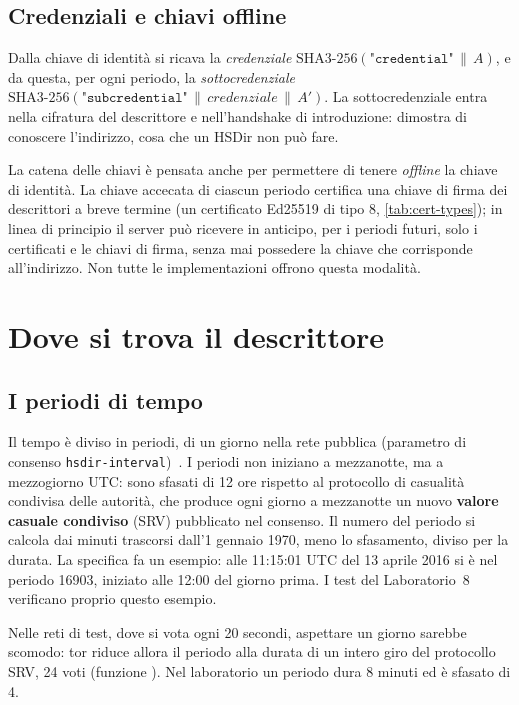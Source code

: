\subsection{Credenziali e chiavi offline}

Dalla chiave di identità si ricava la \emph{credenziale} $\mathrm{SHA3\text{-}256}(\texttt{"credential"} \,\|\, A)$, e da questa, per ogni periodo, la \emph{sottocredenziale} $\mathrm{SHA3\text{-}256}(\texttt{"subcredential"} \,\|\, \mathit{credenziale} \,\|\, A')$. La sottocredenziale entra nella cifratura del descrittore e nell'handshake di introduzione: dimostra di conoscere l'indirizzo, cosa che un HSDir non può fare.

La catena delle chiavi è pensata anche per permettere di tenere \emph{offline} la chiave di identità. La chiave accecata di ciascun periodo certifica una chiave di firma dei descrittori a breve termine (un certificato Ed25519 di tipo 8, \cref{tab:cert-types}); in linea di principio il server può ricevere in anticipo, per i periodi futuri, solo i certificati e le chiavi di firma, senza mai possedere la chiave che corrisponde all'indirizzo. Non tutte le implementazioni offrono questa modalità.

\section{Dove si trova il descrittore}\label{sec:os-hsdir}

\subsection{I periodi di tempo}

Il tempo è diviso in periodi, di un giorno nella rete pubblica (parametro di consenso \texttt{hsdir-interval})~. I periodi non iniziano a mezzanotte, ma a mezzogiorno UTC: sono sfasati di 12 ore rispetto al protocollo di casualità condivisa delle autorità, che produce ogni giorno a mezzanotte un nuovo \textbf{valore casuale condiviso} (SRV) pubblicato nel consenso. Il numero del periodo si calcola dai minuti trascorsi dall'1 gennaio 1970, meno lo sfasamento, diviso per la durata. La specifica fa un esempio: alle 11:15:01 UTC del 13 aprile 2016 si è nel periodo 16903, iniziato alle 12:00 del giorno prima. I test del Laboratorio~8 verificano proprio questo esempio.

Nelle reti di test, dove si vota ogni 20 secondi, aspettare un giorno sarebbe scomodo: tor riduce allora il periodo alla durata di un intero giro del protocollo SRV, 24 voti (funzione ). Nel laboratorio un periodo dura 8 minuti ed è sfasato di 4.

